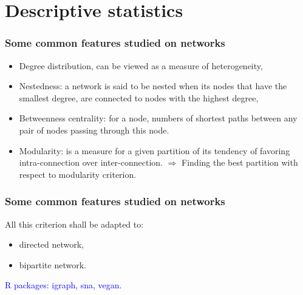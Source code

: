 \documentclass[compress,10pt]{beamer}
\begin{document}
\section{Descriptive statistics}


\begin{frame}
\frametitle{Some common features studied on networks}


\begin{itemize}

\item Degree distribution, can be viewed as a measure of heterogeneity,
\item Nestedness: a network is said to be nested when its nodes that have the smallest degree, are connected to nodes with the highest degree,
\textcolor{blue}{\cite{Rodriguez2006}}

\item Betweenness centrality: for a node, numbers of shortest paths between any pair of nodes passing through this node.
\textcolor{blue}{\cite{FREEMAN1978215}}

\item Modularity: is a measure for a given partition of its tendency of favoring intra-connection over inter-connection.  
$\Rightarrow$ Finding the best partition with respect to modularity criterion. 
\textcolor{blue}{\cite{clauset2008hierarchical}}
\end{itemize}
\end{frame}


\begin{frame}
\frametitle{Some common features studied on networks}

All this criterion shall be adapted to:
\begin{itemize}
 \item directed network,
 \item bipartite network.
\end{itemize}

\bigskip

\textcolor{blue}{R packages: igraph, sna, vegan.} 


\end{frame}
\end{document}
